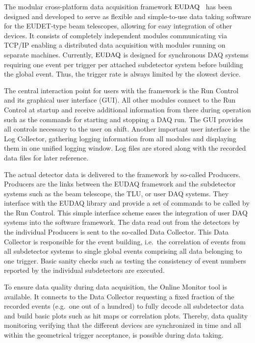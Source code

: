 
The modular cross-platform data acquisition framework $\textrm{EUDAQ}$~\cite{ref:eudaqwebsite} has been designed and developed to serve as flexible and simple-to-use data taking software for the EUDET-type beam telescopes,
 allowing for easy integration of other devices. 
It consists of completely independent modules communicating via TCP/IP enabling a distributed data acquisition with modules running on separate machines. 
Currently, $\textrm{EUDAQ}$ is designed for synchronous DAQ systems requiring one event per trigger per attached subdetector system before building the global event. 
Thus, the trigger rate is always limited by the slowest device.

The central interaction point for users with the framework is the Run Control and its graphical user interface (GUI). 
All other modules connect to the Run Control at startup and receive additional information from there during operation such as the commands for starting and stopping a DAQ run. 
The GUI provides all controls necessary to the user on shift. 
Another important user interface is the Log Collector, gathering logging information from all modules and displaying them in one unified logging window. 
Log files are stored along with the recorded data files for later reference.

The actual detector data is delivered to the framework by so-called Producers.
Producers are the links between the EUDAQ framework and the subdetector systems such as the beam telescope, the TLU, or user DAQ systems.
They interface with the EUDAQ library and provide a set of commands to be called by the Run Control. 
This simple interface scheme eases the integration of user DAQ systems into the software framework.
The data read out from the detectors by the individual Producers is sent to the so-called Data Collector. 
This Data Collector is responsible for the event building, i.e.\ the correlation of events from all subdetector systems to single global events comprising all data belonging to one trigger. 
Basic sanity checks such as testing the consistency of event numbers reported by the individual subdetectors are executed.

To ensure data quality during data acquisition, the Online Monitor tool is available. 
It connects to the Data Collector requesting a fixed fraction of the recorded events (e.g.\ one out of a hundred) to fully decode all subdetector data
 and build basic plots such as hit maps or correlation plots.
Thereby, data quality monitoring verifying that the different devices are synchronized in time and all within the geometrical trigger acceptance, is possible during data taking.

